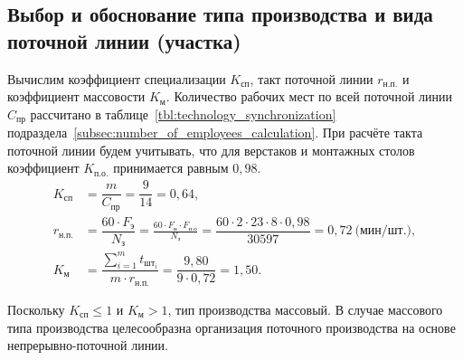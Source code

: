 \subsection{Выбор и обоснование типа производства и вида поточной линии (участка)}
\label{subsec:choice}

Вычислим коэффициент специализации $ K_{\text{сп}} $, такт поточной линии $r_{\text{н.п.}}$
и коэффициент массовости $ K_\text{м} $. Количество рабочих мест по всей поточной
линии $C_{\text{пр}}$ рассчитано в таблице~\ref{tbl:technology_synchronization}
подраздела~\ref{subsec:number_of_employees_calculation}. При расчёте такта поточной
линии будем учитывать, что для верстаков и монтажных столов коэффициент
$ K_\text{п.о.} $ принимается равным $0{,}98$.
\begin{align*}
K_{\text{сп}} &= \dfrac{m}{C_{\text{пр}}} = \dfrac{9}{14} = 0{,}64, \\
r_{\text{н.п.}} &= \dfrac{60 \cdot F_{\text{э}}}{N_{\text{з}}} =
  \frac{60 \cdot F_{\text{н}} \cdot F_{\text{п.о}}}{N_{\text{з}}} =
  \dfrac{60 \cdot 2 \cdot 23 \cdot 8 \cdot 0{,}98}{30 597} =
 0{,}72~\text{(мин/шт.)}, \\
K_{\text{м}} &=
\dfrac{\sum\limits^m_{i=1} t_{\text{шт}_{i}}}{m \cdot r_{\text{н.п.}}} =
\dfrac{9{,}80}{9 \cdot 0{,}72} = 1{,}50.
\end{align*}

Поскольку $ K_{\text{сп}} \le 1 $ и $ K_{\text{м}} > 1 $, тип производства
массовый. В случае массового типа производства целесообразна организация поточного
производства на основе непрерывно-поточной линии.
